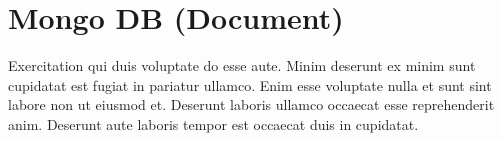 
\chapter{Mongo DB (Document)} \label{ch:mongo}

Exercitation qui duis voluptate do esse aute. Minim deserunt ex minim sunt cupidatat est fugiat in pariatur ullamco. Enim esse voluptate nulla et sunt sint labore non ut eiusmod et. Deserunt laboris ullamco occaecat esse reprehenderit anim. Deserunt aute laboris tempor est occaecat duis in cupidatat.
